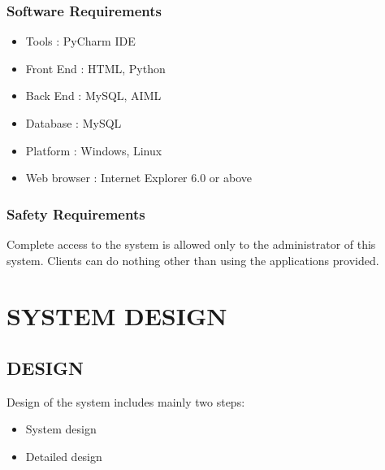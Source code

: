 \documentclass[12pt,a4paper,oneside]{report}
\begin{document}
\subsection{ Software Requirements}
\begin{itemize}
\item Tools : PyCharm IDE
\item Front End : HTML, Python
\item Back End : MySQL, AIML
\item Database : MySQL
\item Platform : Windows, Linux
\item Web browser : Internet Explorer 6.0 or above

\end{itemize}
\subsection{Safety Requirements}
\par Complete access to the system is allowed only to the administrator of this system. Clients can do nothing other than using the applications provided.\\
 
 
\chapter{SYSTEM DESIGN}
\section{DESIGN}
Design of the system includes mainly two steps:
\begin{itemize}
\item{System design}
\item{Detailed design}
\end{itemize}
\end{document}
